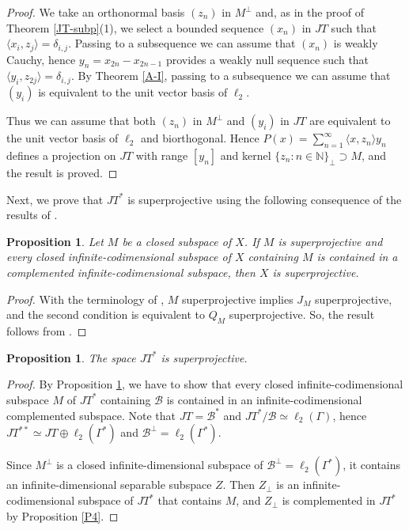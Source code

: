\documentclass[12pt]{amsart}
\theoremstyle{plain}
\numberwithin{equation}{section}
\newcommand{\N}{\mathbb{N}}
\newcommand{\la}{\langle}
\newcommand{\ra}{\rangle}
\newcommand{\B}{\mathcal{B}}
\newtheorem{proposition}[theorem]{Proposition}
\begin{document}
\begin{proof}
We take an orthonormal basis $(z_n)$ in $M^\perp$ and, as in the proof of Theorem \ref{JT-subp}(1), we select a bounded sequence $(x_n)$ in $JT$ such that $\la x_i, z_j\ra=\delta_{i,j}$. Passing to a subsequence we can assume that $(x_n)$ is weakly Cauchy, hence $y_n= x_{2n}- x_{2n-1}$ provides a weakly null sequence such that $\la y_i, z_{2j}\ra=\delta_{i,j}$. By Theorem \ref{A-I}, passing to a subsequence we can assume that $(y_i)$ is equivalent to the unit vector basis of $\ell_2$.

Thus we can assume that both $(z_n)$ in $M^\perp$ and $(y_i)$ in $JT$ are equivalent to the unit vector basis of $\ell_2$ and biorthogonal. Hence $P(x) =\sum_{n=1}^\infty \la x,z_n\ra y_n$ defines a projection on $JT$ with range $[y_n]$ and kernel $\{z_n : n\in\N\}_\perp \supset M$, and the result is proved.
\end{proof}

Next, we prove that $JT^*$ is superprojective using the following consequence of the results of \cite{G-P:24}.

\begin{proposition}\label{GP-24}
Let $M$ be a closed subspace of $X$. If $M$ is superprojective and every closed infinite-codimensional subspace of $X$ containing $M$ is contained in a complemented infinite-codimensional subspace, then $X$ is superprojective.
\end{proposition}
\begin{proof}
With the terminology of \cite{G-P:24}, $M$ superprojective implies $J_M$ superprojective, and the second condition is equivalent to $Q_M$ superprojective. So, the result follows from \cite[Theorem 2.7]{G-P:24}.
\end{proof}


\begin{proposition}
The space $JT^*$ is superprojective.
\end{proposition}
\begin{proof}
By Proposition \ref{GP-24}, we have to show that every closed infinite-codimensional subspace $M$ of $JT^*$ containing $\B$ is contained in an
infinite-codimensional complemented subspace.
Note that $JT=\B^*$ and $JT^*/\B\simeq \ell_2(\Gamma)$, hence $JT^{**}\simeq JT\oplus \ell_2(\Gamma^*)$ and $\B^\perp =\ell_2(\Gamma^*)$.

Since $M^\perp$ is a closed infinite-dimensional subspace of $\B^\perp=\ell_2(\Gamma^*)$, it contains  an infinite-dimensional separable subspace $Z$.
Then $Z_\perp$ is an infinite-codimensional subspace of $JT^*$ that contains $M$, and $Z_\perp$ is complemented in $JT^*$ by Proposition \ref{P4}.
\end{proof}
\end{document}
